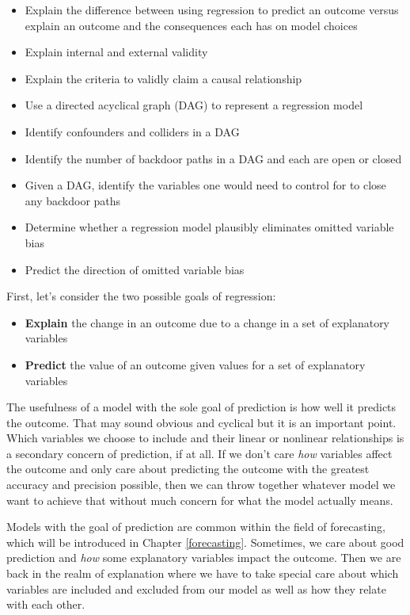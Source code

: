 \documentclass[
]{book}
\providecommand{\tightlist}{%
  \setlength{\itemsep}{0pt}\setlength{\parskip}{0pt}}
\begin{document}
\begin{itemize}
\tightlist
\item
  Explain the difference between using regression to predict an outcome versus explain an outcome and the consequences each has on model choices
\item
  Explain internal and external validity
\item
  Explain the criteria to validly claim a causal relationship
\item
  Use a directed acyclical graph (DAG) to represent a regression model
\item
  Identify confounders and colliders in a DAG
\item
  Identify the number of backdoor paths in a DAG and each are open or closed
\item
  Given a DAG, identify the variables one would need to control for to close any backdoor paths
\item
  Determine whether a regression model plausibly eliminates omitted variable bias
\item
  Predict the direction of omitted variable bias
\end{itemize}

First, let's consider the two possible goals of regression:

\begin{itemize}
\tightlist
\item
  \textbf{Explain} the change in an outcome due to a change in a set of explanatory variables
\item
  \textbf{Predict} the value of an outcome given values for a set of explanatory variables
\end{itemize}

The usefulness of a model with the sole goal of prediction is how well it predicts the outcome. That may sound obvious and cyclical but it is an important point. Which variables we choose to include and their linear or nonlinear relationships is a secondary concern of prediction, if at all. If we don't care \emph{how} variables affect the outcome and only care about predicting the outcome with the greatest accuracy and precision possible, then we can throw together whatever model we want to achieve that without much concern for what the model actually means.

Models with the goal of prediction are common within the field of forecasting, which will be introduced in Chapter \ref{forecasting}. Sometimes, we care about good prediction and \emph{how} some explanatory variables impact the outcome. Then we are back in the realm of explanation where we have to take special care about which variables are included and excluded from our model as well as how they relate with each other.
\end{document}
